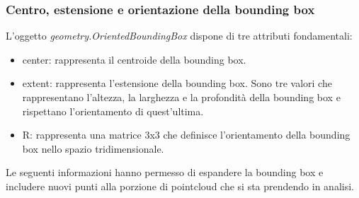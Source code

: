 \documentclass[italian]{article}
\begin{document}
\subsubsection*{Centro, estensione e orientazione della bounding box}
L'oggetto \textit{geometry.OrientedBoundingBox} dispone di tre attributi fondamentali:
\begin{itemize}
	\item center: rappresenta il centroide della bounding box.
	\item extent: rappresenta l'estensione della bounding box. Sono tre valori che rappresentano l'altezza, la larghezza e la profondità della bounding box e rispettano l'orientamento di quest'ultima.
	\item R: rappresenta una matrice 3x3 che definisce l'orientamento della bounding box nello spazio tridimensionale.
\end{itemize}
Le seguenti informazioni hanno permesso di espandere la bounding box e includere nuovi punti alla porzione di pointcloud che si sta prendendo in analisi.
\end{document}
